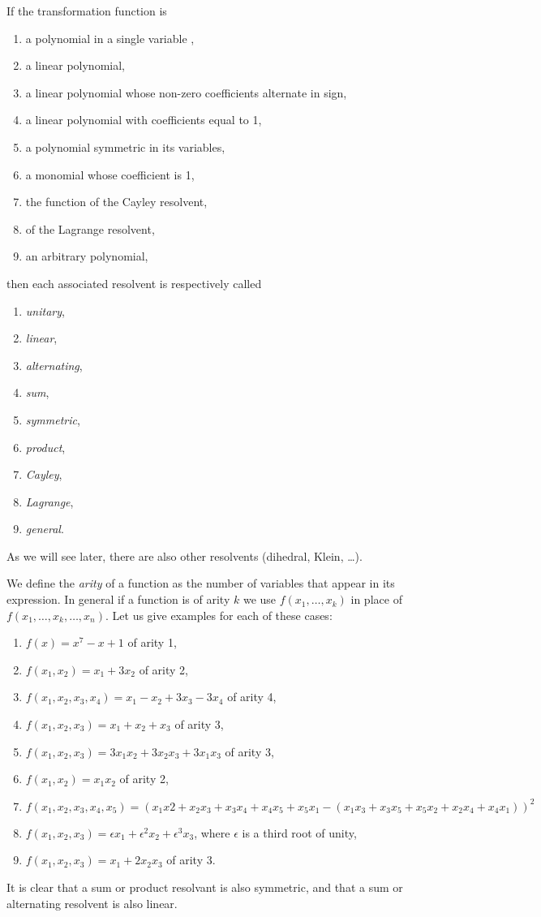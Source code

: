 \documentclass[11pt]{article}
\begin{document}
If the transformation function is
\begin{enumerate}
  \item a polynomial in a single variable ,
  \item a linear polynomial,
  \item a linear polynomial whose non-zero coefficients alternate in sign,
  \item a linear polynomial with coefficients equal to 1,
  \item a polynomial symmetric in its variables,
  \item a monomial whose coefficient is 1,
  \item the function of the Cayley resolvent,
  \item of the Lagrange resolvent,
  \item an arbitrary polynomial,
\end{enumerate}
then each associated resolvent is respectively called
\begin{enumerate}
  \item \textit{unitary},
  \item \textit{linear},
  \item \textit{alternating},
  \item \textit{sum},
  \item \textit{symmetric},
  \item \textit{product},
  \item \textit{Cayley},
  \item \textit{Lagrange},
  \item \textit{general}.
\end{enumerate}
As we will see later, there are also other resolvents (dihedral, Klein, \dots).

We define the \textit{arity} of a function as the number of variables that
appear in its expression.  In general if a function is of arity $k$ we use
$f(x_1,\ldots,x_k)$ in place of $f(x_1,\ldots ,x_k ,\ldots ,x_n)$. Let us give
examples for each of these cases:
\begin{enumerate}
  \item $f(x)=x^7-x+1$ of arity 1,
  \item $f(x_1,x_2) = x_1+3x_2$ of arity 2,
  \item $f(x_1,x_2,x_3,x_4) = x_1 -x_2 + 3x_3-3x_4$ of arity 4,
  \item $f(x_1,x_2,x_3) = x_1+x_2+x_3$ of arity 3,
  \item $f(x_1,x_2,x_3) = 3x_1x_2 + 3x_2x_3 +3x_1x_3$ of arity 3,
  \item $f(x_1,x_2) =x_1x_2$ of arity 2,
  \item $f(x_1,x_2,x_3,x_4,x_5)=(x_1x2+x_2x_3+x_3x_4+x_4x_5+x_5x_1 -
  (x_1x_3+x_3x_5+x_5x_2+x_2x_4+x_4x_1))^2$
  \item $f(x_1,x_2,x_3) = \epsilon x_1 + \epsilon^2 x_2 + \epsilon^3 x_3$, where
  $\epsilon$ is a third root of unity,
  \item $f(x_1,x_2,x_3) = x_1 +2x_2x_3$ of arity 3.
\end{enumerate}
It is clear that a sum or product resolvant is also symmetric, and that a sum or
alternating resolvent is also linear.
\end{document}
